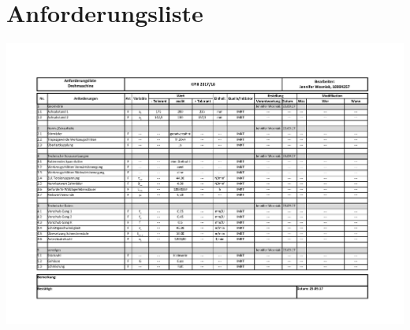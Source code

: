 \chapter{Anforderungsliste}
\mbox{} \begin{center}
	\begin{sideways}%
		\vspace{-1cm}
		\begin{minipage}{1.3\textwidth}
			\includegraphics[width=1.04\textwidth,keepaspectratio]{figures/Anforderungsliste.pdf}
			\label{fig:anforderungsliste}
		\end{minipage}
	\end{sideways}
\end{center}
